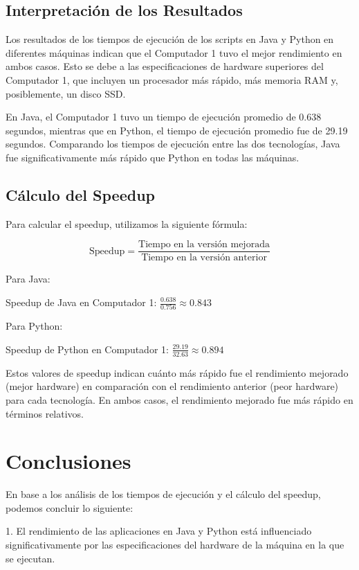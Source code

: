 \documentclass[conference]{IEEEtran}
\begin{document}
\subsection{Interpretación de los Resultados}

Los resultados de los tiempos de ejecución de los scripts en Java y Python en diferentes máquinas indican que el Computador 1 tuvo el mejor rendimiento en ambos casos. Esto se debe a las especificaciones de hardware superiores del Computador 1, que incluyen un procesador más rápido, más memoria RAM y, posiblemente, un disco SSD.

En Java, el Computador 1 tuvo un tiempo de ejecución promedio de 0.638 segundos, mientras que en Python, el tiempo de ejecución promedio fue de 29.19 segundos. Comparando los tiempos de ejecución entre las dos tecnologías, Java fue significativamente más rápido que Python en todas las máquinas.

\subsection{Cálculo del Speedup}

Para calcular el speedup, utilizamos la siguiente fórmula:

\[ \text{Speedup} = \frac{\text{Tiempo en la versión mejorada}}{\text{Tiempo en la versión anterior}} \]

Para Java:

Speedup de Java en Computador 1: \( \frac{0.638}{0.756} \approx 0.843 \)

Para Python:

Speedup de Python en Computador 1: \( \frac{29.19}{32.63} \approx 0.894 \)

Estos valores de speedup indican cuánto más rápido fue el rendimiento mejorado (mejor hardware) en comparación con el rendimiento anterior (peor hardware) para cada tecnología. En ambos casos, el rendimiento mejorado fue más rápido en términos relativos.

\section{Conclusiones}

En base a los análisis de los tiempos de ejecución y el cálculo del speedup, podemos concluir lo siguiente:

1. El rendimiento de las aplicaciones en Java y Python está influenciado significativamente por las especificaciones del hardware de la máquina en la que se ejecutan.
\end{document}
